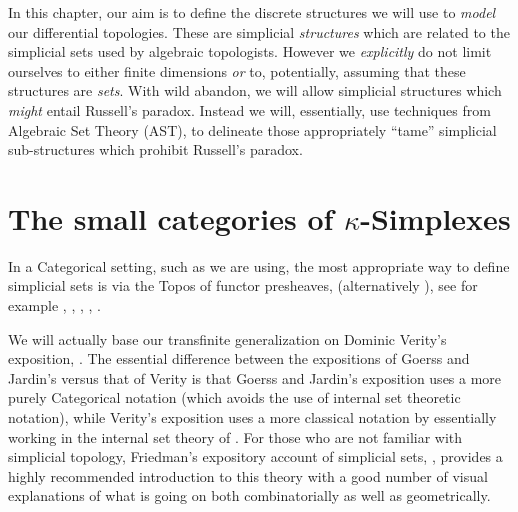In this chapter, our aim is to define the discrete structures we will use to \emph{model}
our differential topologies.  These are simplicial \emph{structures} which are related to
the simplicial sets used by algebraic topologists.  However we \emph{explicitly} do not
limit ourselves to either finite dimensions \emph{or} to, potentially, assuming that these
structures are \emph{sets}.  With wild abandon, we will allow simplicial structures which
\emph{might} entail Russell's paradox.  Instead we will, essentially, use techniques from
Algebraic Set Theory (AST), to delineate those appropriately ``tame'' simplicial
sub-structures which prohibit Russell's paradox.  

\section{The small categories of \texorpdfstring{$\kappa$}{kappa}-Simplexes} 

In a Categorical setting, such as we are using, the most appropriate way to define
simplicial sets is via the Topos of functor presheaves, \opFuncCat{\DeltaC{}{}}{\setC{}}
(alternatively \altOpFuncCat{\DeltaC{}{}}{\setC{}}), see for example \cite[Chapter
1]{goerssJardin1999SimplicialHomotopyTh}, \cite[Section
VII.5]{macLane1971categoriesWorkingMathematician}, \cite[section
2.1]{verity2005complicialSets}, \cite[Section I.2]{may1967simplicialObjectsInAlgTopo},
\cite[Chapter 2]{gabrielZisman1967homotopyTh} .

We will actually base our transfinite generalization on Dominic Verity's exposition,
\cite[section 2.1]{verity2005complicialSets}. The essential difference between the
expositions of Goerss and Jardin's versus that of Verity is that Goerss and Jardin's
exposition uses a more purely Categorical notation (which avoids the use of internal set
theoretic notation), while Verity's exposition uses a more classical notation by
essentially working in the internal set theory of \setC{}.  For those who are not familiar
with simplicial topology, Friedman's expository account of simplicial sets,
\cite{friedman2008illustratedIntroduction}, provides a highly recommended introduction to 
this theory
with a good number of visual explanations of what is going on both combinatorially as well
as geometrically.

